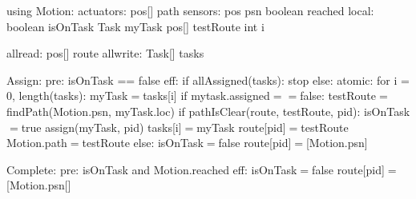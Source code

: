 using Motion:
  actuators:
    pos[] path
  sensors:
    pos psn
    boolean reached
local:
  boolean isOnTask
  Task myTask
  pos[] testRoute
  int i

allread:
  pos[] route
allwrite:
  Task[] tasks

Assign:
  pre: isOnTask == false
  eff: if allAssigned(tasks): stop
    else: atomic:
      for i = 0, length(tasks):
          myTask$=$tasks[i]
        if mytask.assigned$==$false:
            testRoute$=$findPath(Motion.psn, myTask.loc)
            if pathIsClear(route, testRoute, pid):
              isOnTask$=$true
              assign(myTask, pid)
              tasks[i]$=$myTask
              route[pid]$=$testRoute
              Motion.path$=$testRoute
            else:
              isOnTask$=$false
              route[pid]$=$[Motion.psn]

Complete:
    pre: isOnTask and Motion.reached
    eff: isOnTask$=$false
         route[pid]$=$[Motion.psn[]